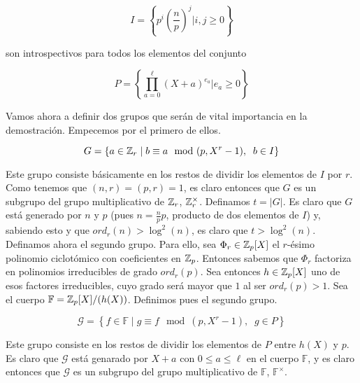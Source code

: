 \begin{equation}\label{i_valores_introspectivos}
I = \left\{ p^i\left(\frac{n}{p}\right)^j | i, j \geq 0 \right\}
\end{equation}

son introspectivos para todos los elementos del conjunto

\begin{equation}\label{p_polinomios_introspectivos}
P = \left\{ \prod_{a=0}^{\ell}(X + a)^{e_a} | e_a \geq 0 \right\}
\end{equation}

Vamos ahora a definir dos grupos que serán de vital importancia en la demostración. Empecemos por el primero de ellos.

\begin{equation}\label{grupo_introspectivos}
G = \left\{ a \in \mathbb{Z}_r \mid b \equiv a \mod(p, X^r - 1),\;\;b \in I \right\}
\end{equation}

Este grupo consiste básicamente en los restos de dividir los elementos de $I$ por $r$. Como tenemos que $(n, r) = (p, r) = 1$, es claro entonces que $G$ es un subgrupo del grupo multiplicativo de $\mathbb{Z}_r$, $\mathbb{Z}_r^\times$. Definamos $t = |G|$. Es claro que $G$ está generado por $n$ y $p$ (pues $n = \frac{n}{p}p$, producto de dos elementos de $I$) y, sabiendo esto y que $ord_r(n) > \log^2(n)$, es claro que $t > \log^2(n)$.\\

Definamos ahora el segundo grupo. Para ello, sea $\Phi_r \in \mathbb{Z}_p[X]$ el $r$-ésimo polinomio ciclotómico con coeficientes en $\mathbb{Z}_p$. Entonces sabemos que $\Phi_r$ factoriza en polinomios irreducibles de grado $ord_r(p)$. Sea entonces $h \in \mathbb{Z}_p[X]$ uno de esos factores irreducibles, cuyo grado será mayor que $1$ al ser $ord_r(p) > 1$. Sea el cuerpo $\mathbb{F} = \mathbb{Z}_p[X]/(h(X))$. Definimos pues el segundo grupo.

\begin{equation}\label{grupo_polinomios_introspectivos}
\mathcal{G} = \left\{ f \in \mathbb{F} \mid g \equiv f \mod(p, X^r - 1),\;\;g \in P \right\}
\end{equation}

Este grupo consiste en los restos de dividir los elementos de $P$ entre $h(X)$ y $p$. Es claro que $\mathcal{G}$ está genarado por $X + a$ con $0\leq a \leq \ell$ en el cuerpo $\mathbb{F}$, y es claro entonces que $\mathcal{G}$ es un subgrupo del grupo multiplicativo de $\mathbb{F}$, $\mathbb{F}^\times$.\\

